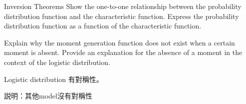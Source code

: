 \documentclass[UTF8,a4paper,10pt]{article}
\begin{document}
\begin{mybox}{}


\end{mybox}





\begin{Problem}[]{Inversion Theorems}
  Show the one-to-one relationship between the probability distribution function and the characteristic function. Express the probability distribution function as a function of the characteristic function.

\end{Problem}


\begin{Problem}[]{}
  Explain why the moment generation function does not exist when a certain moment is absent. Provide an explanation for the absence of a moment in the context of the logistic distribution.
\end{Problem}

\begin{Problem}[]{}
  Logistic distribution 有對稱性。

  説明：其他model沒有對稱性
\end{Problem}



    





\end{document}
